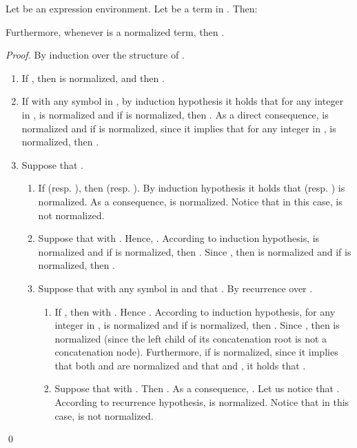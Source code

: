 \documentclass[a4paper]{llncs}
\begin{document}
  
  \begin{proposition}\label{prop t prim norm}
    Let  be an expression environment. Let  be a term in . Then:
           
    
    Furthermore, whenever  is a normalized term, then .
  \end{proposition}
  \begin{proof}
    By induction over the structure of .
    \begin{enumerate}
      \item If , then  is normalized,  and then .
    
      \item If  with  any symbol in , by induction hypothesis it holds that for any integer  in ,  is normalized and if  is normalized, then . As a direct consequence,  is normalized and if  is normalized, since it implies that for any integer  in ,  is normalized, then .
    
      \item Suppose that . 
\begin{enumerate}
        \item If  (resp. ), then  (resp. ). By induction hypothesis it holds that  (resp. ) is normalized. As a consequence,  is normalized. Notice that in this case,  is not normalized.
\item Suppose that  with . Hence, . According to induction hypothesis,  is normalized and if  is normalized, then . Since , then  is normalized and if  is normalized, then .
\item Suppose that  with  any symbol in  and that . By recurrence over . 
        \begin{enumerate}
          \item If , then  with . Hence . According to induction hypothesis, for any integer  in ,  is normalized and if  is normalized, then . Since , then  is normalized (since the left child of its concatenation root is not a concatenation node). Furthermore, if  is normalized, since it implies that both  and  are normalized and that  and , it holds that . 
          \item Suppose that  with . Then . As a consequence, . Let us notice that . According to recurrence hypothesis,  is normalized. Notice that in this case,  is not normalized.
        \end{enumerate}
      \end{enumerate}
    \end{enumerate}
    \qed
  \end{proof}
  
\end{document}
